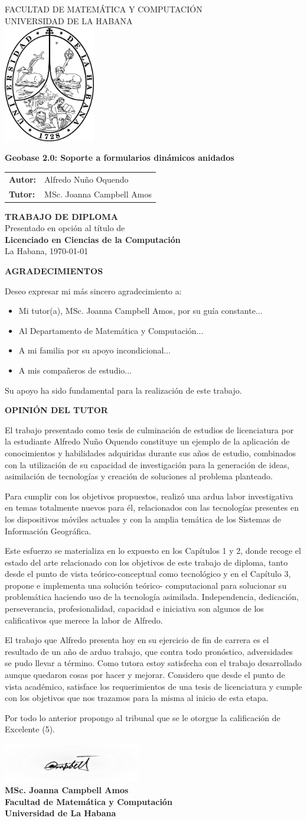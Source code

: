\documentclass[12pt, a4paper]{book}
\date{}
\newcommand{\portada}[5]{ %
  \begin{titlepage}
    \begin{center}
      {\normalsize FACULTAD DE MATEMÁTICA Y COMPUTACIÓN} \\
      {\normalsize UNIVERSIDAD DE LA HABANA} \\
      \vspace{1cm}
      \includegraphics[width=0.3\textwidth]{images/uhlogo.png} \\
      \vspace{2cm}
      
      {\LARGE \textbf{#1}} \\
      \vspace{2cm}
      
      \begin{tabular}{l l}
        \textbf{Autor:} & #2 \\
        \textbf{Tutor:} & #3 \\
      \end{tabular}
      \vspace{2cm}
      
      \textbf{TRABAJO DE DIPLOMA} \\
      Presentado en opción al título de \\
      \textbf{#4} \\
      \vfill
      #5 %
    \end{center}
  \end{titlepage}
}
\newenvironment{opiniontutor}
{
  \cleardoublepage
  \thispagestyle{empty}
  \begin{center}
    {\LARGE\bfseries OPINIÓN DEL TUTOR} \\[1.5cm] %
  \end{center}
  \setlength{\parskip}{1em} %
}
{
  \vspace{3cm} %
  \begin{flushright}
    \includegraphics[width=6cm]{images/firma_tutor.png} \\ %
    \vspace{0.5cm} %
    \textbf{MSc. Joanna Campbell Amos} \\
    \textbf{Facultad de Matemática y Computación} \\
    \textbf{Universidad de La Habana}
  \end{flushright}
}
\newenvironment{agradecimientos}{
  \clearpage %
  \thispagestyle{empty} %
  \begin{center}
    {\LARGE\bfseries AGRADECIMIENTOS} \\[1.5cm]
  \end{center}
  \setlength{\parindent}{0pt} %
  \setlength{\parskip}{1em} %
}{
  \vspace*{\fill} %
  \newpage %
}
\let\cleardoublepage\clearpage %
\begin{document}
\portada
  {Geobase 2.0: Soporte a formularios dinámicos anidados} %
  {Alfredo Nuño Oquendo}                %
  {MSc. Joanna Campbell Amos}           %
  {Licenciado en Ciencias de la Computación} %
  {La Habana, \today}                       %

\begin{agradecimientos}
  Deseo expresar mi más sincero agradecimiento a:
  
  \begin{itemize}
  \item Mi tutor(a), MSc. Joanna Campbell Amos, por su guía constante...
  \item Al Departamento de Matemática y Computación...
  \item A mi familia por su apoyo incondicional...
  \item A mis compañeros de estudio...
  \end{itemize}
  
  Su apoyo ha sido fundamental para la realización de este trabajo.
  \end{agradecimientos}

\begin{opiniontutor}
  El trabajo presentado como tesis de culminación de estudios de licenciatura por la estudiante Alfredo Nuño Oquendo  constituye un ejemplo de la aplicación de conocimientos y habilidades adquiridas durante sus años de estudio, combinados con la utilización de su capacidad de investigación para la generación de ideas, asimilación de tecnologías y creación de soluciones al problema planteado.

  Para cumplir con los objetivos propuestos, realizó una ardua labor investigativa en temas totalmente nuevos para él, relacionados con las tecnologías presentes en los dispositivos móviles actuales y con la amplia temática de los Sistemas de Información Geográfica.

  Este esfuerzo se materializa en lo expuesto en los Capítulos 1 y 2, donde recoge el estado del arte relacionado con los objetivos de este trabajo de diploma, tanto desde el punto de vista teórico-conceptual como tecnológico y en el Capítulo 3, propone e implementa  una solución teórico- computacional  para solucionar su problemática haciendo uso de la tecnología asimilada. Independencia, dedicación, perseverancia, profesionalidad, capacidad e iniciativa son algunos de los calificativos que merece la labor de Alfredo.

  El trabajo que Alfredo presenta hoy en su ejercicio de fin de carrera es el resultado de un año  de arduo trabajo, que contra todo pronóstico, adversidades se pudo llevar a término.  Como tutora estoy satisfecha con el trabajo desarrollado aunque quedaron cosas por hacer  y mejorar. Considero que desde el punto de vista académico, satisface los requerimientos de una tesis de licenciatura y cumple con los objetivos que nos trazamos para la misma al inicio de esta etapa.

  Por todo lo anterior propongo al tribunal que se le otorgue la calificación de Excelente (5).

\end{opiniontutor}
\end{document}
